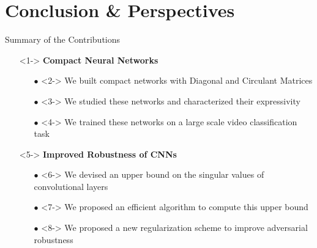 \section{Conclusion \& Perspectives}


\begin{frame}{Summary of the Contributions}

  \begin{itemize}
    \item[\orangebold{1.}] <1-> \textbf{Compact Neural Networks}
    \small{
    \begin{itemize}[itemsep=2pt]
      \item[$\bullet$] <2-> We built compact networks with Diagonal and Circulant Matrices
      \item[$\bullet$] <3-> We studied these networks and characterized their expressivity
      \item[$\bullet$] <4-> We trained these networks on a large scale video classification task
    \end{itemize}}
    \vspace{0.5cm}
    \item[\orangebold{2.}] <5-> \textbf{Improved Robustness of CNNs}
      \small{
      \begin{itemize}[itemsep=2pt]
        \item[$\bullet$] <6-> We devised an upper bound on the singular values of convolutional layers
        \item[$\bullet$] <7-> We proposed an efficient algorithm to compute this upper bound
        \item[$\bullet$] <8-> We proposed a new regularization scheme to improve adversarial robustness
      \end{itemize}}
  \end{itemize}

\end{frame}


